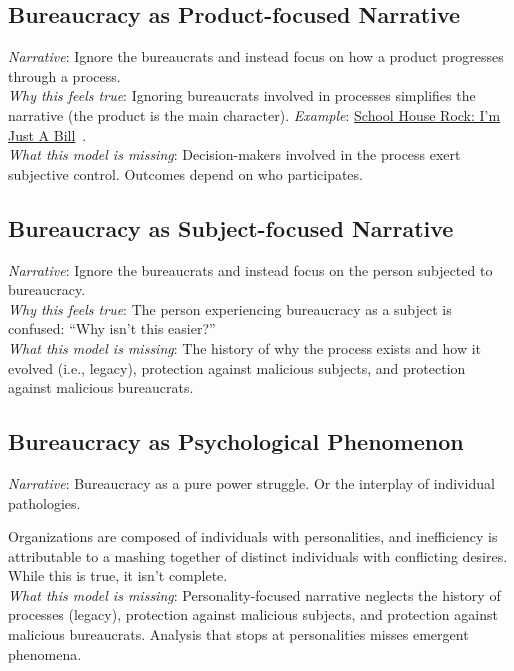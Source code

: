 \subsection*{Bureaucracy as Product-focused Narrative}
\textit{Narrative}: Ignore the bureaucrats and instead focus on how a product progresses through a process.\\
\textit{Why this feels true}: Ignoring bureaucrats involved in processes simplifies the narrative (the product is the main character). 
\textit{Example}: \href{https://www.youtube.com/watch?v=OgVKvqTItto}{School House Rock: I'm Just A Bill}~\cite{1975_Frishberg}.\\
\textit{What this model is missing}: Decision-makers involved in the process exert subjective control. Outcomes depend on who participates. 

\subsection*{Bureaucracy as Subject-focused Narrative}
\textit{Narrative}: Ignore the bureaucrats and instead focus on the person subjected to bureaucracy. \\
\textit{Why this feels true}: The person experiencing bureaucracy as a subject is confused: ``Why isn't this easier?''  \\
\textit{What this model is missing}: The history of why the process exists and how it evolved (i.e., legacy), protection against malicious subjects, and protection against malicious bureaucrats. 


\subsection*{Bureaucracy as Psychological Phenomenon}

\textit{Narrative}: Bureaucracy as a pure power struggle. Or the interplay of individual pathologies. 

Organizations are composed of individuals with personalities, and inefficiency is attributable to a mashing together of distinct individuals with conflicting desires.
While this is true, it isn't complete. \\
\textit{What this model is missing}: Personality-focused narrative neglects the history of processes (legacy), protection against malicious subjects, and protection against malicious bureaucrats. Analysis that stops at personalities misses emergent phenomena. %

